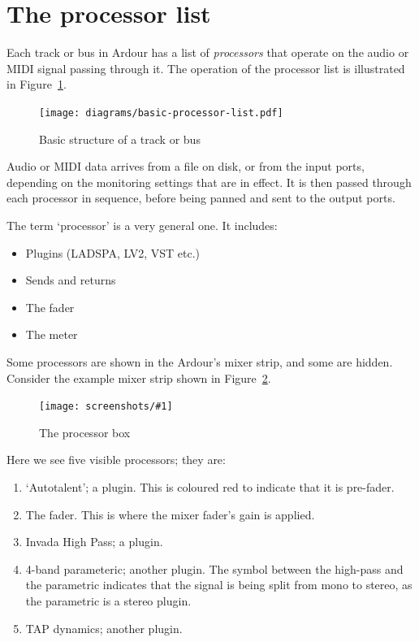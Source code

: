 \documentclass[10pt,a4paper]{book}
\newcommand{\screenshot}[3]{%
\begin{figure}[ht]%
\begin{center}
\texttt{[image: screenshots/\#1]}
\end{center}
\caption{#2}
\label{#3}
\end{figure}}
\begin{document}
{\section{The processor list}

Each track or bus in Ardour has a list of \emph{processors} that
operate on the audio or MIDI signal passing through it.  The operation
of the processor list is illustrated in
Figure~\ref{fig:basic-processor-list}.

\begin{figure}[ht]
\begin{center}
\texttt{[image: diagrams/basic-processor-list.pdf]}
\end{center}
\caption{Basic structure of a track or bus}
\label{fig:basic-processor-list}
\end{figure}

Audio or MIDI data arrives from a file on disk, or from the input
ports, depending on the monitoring settings that are in effect.  It is
then passed through each processor in sequence, before being panned
and sent to the output ports.

The term `processor' is a very general one.  It includes:

\begin{itemize}
\item Plugins (LADSPA, LV2, VST etc.)
\item Sends and returns
\item The fader
\item The meter
\end{itemize}

Some processors are shown in the Ardour's mixer strip, and some are
hidden.  Consider the example mixer strip shown in Figure~\ref{fig:processor-box}.

\screenshot{processor-box.png}{The processor box}{fig:processor-box}

Here we see five visible processors; they are:

\begin{enumerate}
\item `Autotalent'; a plugin.  This is coloured red to indicate
  that it is pre-fader.
\item The fader.  This is where the mixer fader's gain is applied.
\item Invada High Pass; a plugin.
\item 4-band parameteric; another plugin.  The symbol between the
  high-pass and the parametric indicates that the signal is being
  split from mono to stereo, as the parametric is a stereo plugin.
\item TAP dynamics; another plugin.
\end{enumerate}

}
\end{document}

